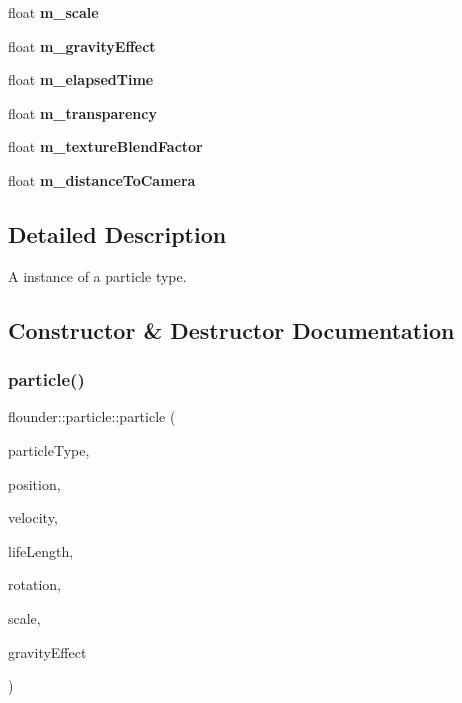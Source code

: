 \begin{DoxyCompactItemize}
float {\bfseries m\+\_\+scale}
\item 
\mbox{\label{classflounder_1_1particle_a89fa019cd36d5e6fa542eb33ac9b34b5}} 
float {\bfseries m\+\_\+gravity\+Effect}
\item 
\mbox{\label{classflounder_1_1particle_a828c23414722c25eb3f89b21a419440c}} 
float {\bfseries m\+\_\+elapsed\+Time}
\item 
\mbox{\label{classflounder_1_1particle_af2ceb2a4d87d3be75e37b57406ff7aee}} 
float {\bfseries m\+\_\+transparency}
\item 
\mbox{\label{classflounder_1_1particle_a01141f7b55d500f6585c222c5805c73c}} 
float {\bfseries m\+\_\+texture\+Blend\+Factor}
\item 
\mbox{\label{classflounder_1_1particle_adcb853f70ee498c3a766da5b2b25c529}} 
float {\bfseries m\+\_\+distance\+To\+Camera}
\end{DoxyCompactItemize}


\subsection{Detailed Description}
A instance of a particle type. 



\subsection{Constructor \& Destructor Documentation}
\mbox{\label{classflounder_1_1particle_a031b89de2f5f74b55cc97209229eaccd}} 
\subsubsection{\texorpdfstring{particle()}{particle()}}
{\footnotesize\ttfamily flounder\+::particle\+::particle (\begin{DoxyParamCaption}\item[{\hyperlink{classflounder_1_1particletype}{particletype} $\ast$}]{particle\+Type,  }\item[{const \hyperlink{classflounder_1_1vector3}{vector3} \&}]{position,  }\item[{const \hyperlink{classflounder_1_1vector3}{vector3} \&}]{velocity,  }\item[{const float \&}]{life\+Length,  }\item[{const float \&}]{rotation,  }\item[{const float \&}]{scale,  }\item[{const float \&}]{gravity\+Effect }\end{DoxyParamCaption})}



